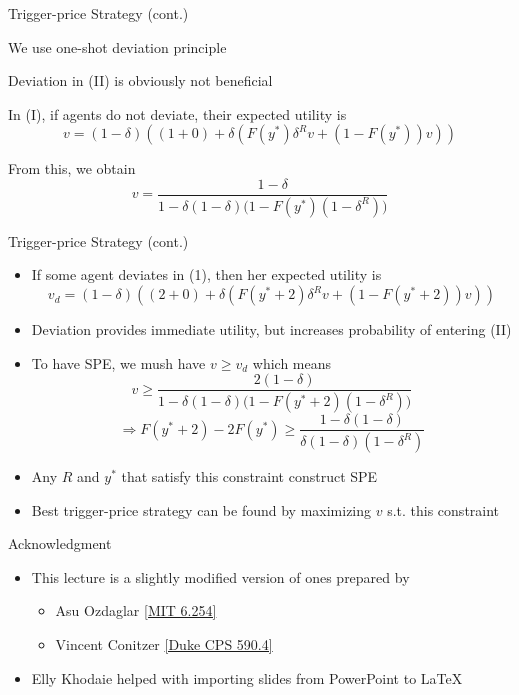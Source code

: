 \documentclass[11pt,aspectratio=169]{beamer}
\begin{document}
  \begin{frame} {Trigger-price Strategy (cont.)}
   \begin{itemizes}
    \item We use one-shot deviation principle
    \item Deviation in (II) is obviously not beneficial
    \item In (I), if agents do not deviate, their \alert{expected utility} is
    $$
    v = (1-\delta)\left((1+0)+\delta\left(F(y^*)\delta^{R} v + (1-F(y^*)) v \right)\right)
    $$
    \item From this, we obtain
    $$
    v = \frac{1-\delta}{1-\delta(1-\delta)\big(1-F(y^*)(1-\delta^{R})\big)}
    $$    
   \end{itemizes}
  \end{frame}

  \begin{frame}{Trigger-price Strategy (cont.)}
   
   \begin{itemize}
    \item If some agent deviates in (1), then her expected utility is
    $$
    v_d = (1-\delta)\left((2+0)+\delta\left(F(y^*+2)\delta^{R} v + (1-F(y^*+2)) v \right)\right)
    $$
    \item Deviation provides immediate utility, but increases probability of entering (II)
    \item To have SPE, we mush have $v \geq v_d$ which means
    $$
    v \ge \frac{2(1-\delta)}{1-\delta(1-\delta)\big(1-F(y^*+2)(1-\delta^{R})\big)}
    $$
    $$
    \Rightarrow F(y^*+2)-2F(y^*) \ge \frac{1-\delta(1-\delta)}{\delta(1-\delta)(1-\delta^{R})}
    $$
    \item  Any $R$ and $y^{*}$ that satisfy this constraint construct SPE
    \item \alert{Best trigger-price strategy} can be found by maximizing $v$ s.t. this constraint
   \end{itemize}
 
  \end{frame}  
  
  
  \begin{frame}{Acknowledgment}
   \begin{itemize}
   \setlength{\itemsep}{1em}
    \item This lecture is a slightly modified version of ones prepared by
    \begin{itemize}
     \item Asu Ozdaglar \href{https://ocw.mit.edu/courses/electrical-engineering-and-computer-science/6-254-game-theory-with-engineering-applications-spring-2010/index.htm}{[MIT 6.254]}
     \item Vincent Conitzer \href{https://courses.cs.duke.edu/spring16/compsci590.4/}{[Duke CPS 590.4]}
    \end{itemize}
    \item Elly Khodaie helped with importing slides from PowerPoint to \LaTeX
   \end{itemize}
  \end{frame}
\end{document}
